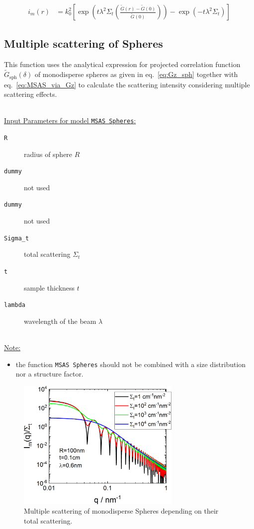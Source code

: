\begin{align}
 i_m(r) &= k_0^2\left[\exp\left(t\lambda^2\Sigma_t\left(\frac{\tilde{G}(r)-\tilde{G}(0)}{\tilde{G}(0)}\right)\right)-\exp\left(-t\lambda^2\Sigma_t\right)\right]
 \label{eq:MSAS_via_Gz}
\end{align}

\newpage
\subsection{Multiple scattering of Spheres}

This function uses the analytical expression for projected correlation function $\tilde{G}_\mathrm{sph}(\delta)$ of monodisperse spheres as given in eq.\ \ref{eq:Gz_sph} together with eq.\ \ref{eq:MSAS_via_Gz} to calculate the scattering intensity considering multiple scattering effects.

\hspace{1pt}\\
\underline{Input Parameters for model \texttt{MSAS Spheres}:}\\
\begin{description}
\item[\texttt{R}] radius of sphere $R$
\item[\texttt{dummy}] not used
\item[\texttt{dummy}] not used
\item[\texttt{Sigma\_t}] total scattering $\Sigma_t$
\item[\texttt{t}] sample thickness $t$
\item[\texttt{lambda}] wavelength of the beam $\lambda$
\end{description}

\hspace{1pt}\\
\underline{Note:}
\begin{itemize}
\item the function \texttt{MSAS Spheres} should not be combined with a size distribution nor a structure factor.
\end{itemize}

\begin{figure}[htb]
\begin{center}
\includegraphics[width=0.7\textwidth]{../images/form_factor/MSAS/MSAS_Spheres.png}
\end{center}
\caption{Multiple scattering of monodisperse Spheres depending on their total scattering.}
\label{fig:MSAS_Spheres}
\end{figure}

